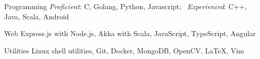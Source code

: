 \begin{cvskills}

  \cvskill
  {Programming}
  {\textit{Proficient}: C, Golang, Python, Javascript; \
    \textit{Experienced}: C++, Java, Scala, Android}

  \cvskill
  {Web}
  {Express.js with Node.js, Akka with Scala, JavaScript, TypeScript, Angular}

  \cvskill
  {Utilities}
  {Linux shell utilities, Git, Docker,
    MongoDB, OpenCV, \LaTeX, Vim}

\end{cvskills}

